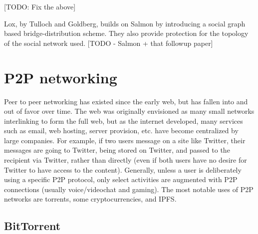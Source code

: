\documentclass[12pt]{report}
\begin{document}
[TODO: Fix the above]

Lox, by Tulloch and Goldberg, builds on Salmon by introducing a social graph based bridge-distribution scheme. They also provide protection for the topology of the social network used.\cite{lox} 
[TODO - Salmon + that followup paper]

\section{P2P networking}

Peer to peer networking has existed since the early web, but has fallen into and out of favor over time. The web was originally envisioned as many small networks interlinking to form the full web, but as the internet developed, many services such as email, web hosting, server provision, etc. have become centralized by large companies. For example, if two users message on a site like Twitter, their messages are going to Twitter, being stored on Twitter, and passed to the recipient via Twitter, rather than directly (even if both users have no desire for Twitter to have access to the content). Generally, unless a user is deliberately using a specific P2P protocol, only select activities are augmented with P2P connections (usually voice/videochat and gaming). The most notable uses of P2P networks are torrents, some cryptocurrencies, and IPFS.

\subsection{BitTorrent}
\label{torrent}
\end{document}
